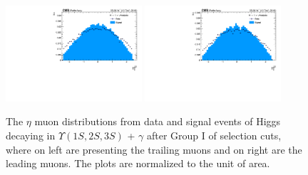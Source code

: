 \begin{figure}[!htbp]
\begin{center}
\includegraphics[width=0.45\textwidth]{figures/outputPlots/HtoUpsilon_Cat0_ZZZZZ/au/data_x_mc/noKinCuts/h_noKin_TrailingMu_eta}\hspace*{1.cm}
\includegraphics[width=0.45\textwidth]{figures/outputPlots/HtoUpsilon_Cat0_ZZZZZ/au/data_x_mc/noKinCuts/h_noKin_LeadingMu_eta}
\end{center}\vspace*{-.5cm}
\caption{The $\eta$ muon distributions from data and signal events of Higgs decaying in $\Upsilon(1S,2S,3S)$ + $\gamma$ after Group I of selection cuts, where on left are presenting the trailing muons and on right are the leading muons. The plots are normalized to the unit of area.}
\label{fig:etaMuons_HtoUpsilon_Cat0}
\end{figure}

